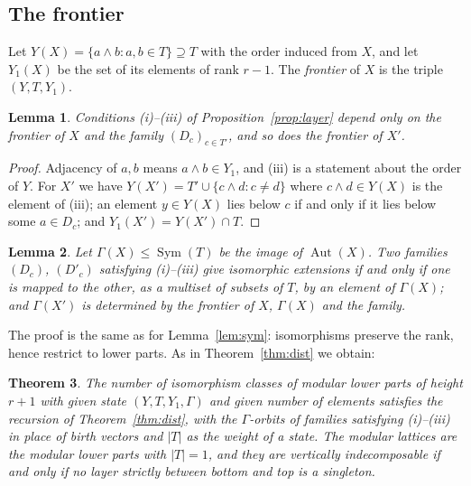 \documentclass[11pt]{amsart}
\newtheorem{theorem}{Theorem}[section]
\newtheorem{lemma}[theorem]{Lemma}
\theoremstyle{definition}
\theoremstyle{remark}
\newcommand{\Aut}{\operatorname{Aut}}
\newcommand{\Sym}{\operatorname{Sym}}
\begin{document}
\subsection{The frontier}
Let $Y(X) = \{a \wedge b : a,b \in T\} \supseteq T$ with the order induced from $X$, and let
$Y_1(X)$ be the set of its elements of rank $r-1$.  The \emph{frontier} of $X$ is the
triple $(Y,T,Y_1)$.

\begin{lemma}\label{lem:modfrontier}
Conditions \textup{(i)--(iii)} of Proposition~\ref{prop:layer} depend only on the
frontier of $X$ and the family $(D_c)_{c \in T'}$, and so does the frontier of $X'$.
\end{lemma}

\begin{proof}
Adjacency of $a,b$ means $a \wedge b \in Y_1$, and (iii) is a statement about the
order of $Y$.  For $X'$ we have $Y(X') = T' \cup \{c \wedge d : c \ne d\}$ where
$c \wedge d \in Y(X)$ is the element of (iii); an element $y \in Y(X)$ lies below $c$ if
and only if it lies below some $a \in D_c$; and $Y_1(X') = Y(X') \cap T$.
\end{proof}

\begin{lemma}\label{lem:modsym}
Let $\Gamma(X) \le \Sym(T)$ be the image of $\Aut(X)$.  Two families $(D_c)$,
$(D'_c)$ satisfying \textup{(i)--(iii)} give isomorphic extensions if and only if one
is mapped to the other, as a multiset of subsets of $T$, by an element of $\Gamma(X)$;
and $\Gamma(X')$ is determined by the frontier of $X$, $\Gamma(X)$ and the family.
\end{lemma}

The proof is the same as for Lemma~\ref{lem:sym}: isomorphisms preserve the rank, hence
restrict to lower parts.  As in Theorem~\ref{thm:dist} we obtain:

\begin{theorem}\label{thm:mod}
The number of isomorphism classes of modular lower parts of height $r+1$ with given
state $(Y,T,Y_1,\Gamma)$ and given number of elements satisfies the recursion of
Theorem~\ref{thm:dist}, with the $\Gamma$-orbits of families satisfying
\textup{(i)--(iii)} in place of birth vectors and $|T|$ as the weight of a state.
The modular lattices are the modular lower parts with $|T| = 1$, and they are vertically
indecomposable if and only if no layer strictly between bottom and top is a singleton.
\end{theorem}
\end{document}
